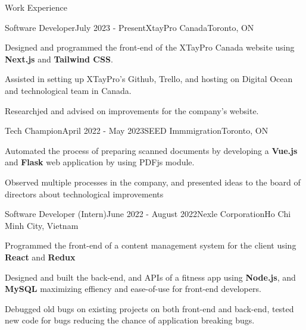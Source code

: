 \documentclass[
	11pt, %
]{resume} %
\begin{document}



\begin{rSection}{Work Experience}

	\begin{rSubsection}{Software Developer}{July 2023 - Present}{XtayPro Canada}{Toronto, ON}
		\item Designed and programmed the front-end of the XTayPro Canada website using \textbf{Next.js} and \textbf{Tailwind CSS}.
		\item Assisted in setting up XTayPro's Github, Trello, and hosting on Digital Ocean and technological team in Canada.
		\item Researchjed and advised on improvements for the company's website.
	\end{rSubsection}


	\begin{rSubsection}{Tech Champion}{April 2022 - May 2023}{SEED Immmigration}{Toronto, ON}
		\item Automated the process of preparing scanned documents by developing a \textbf{Vue.js} and \textbf{Flask} web application by using PDFjs module.
		\item Observed multiple processes in the company, and presented ideas to the board of directors about technological improvements
	\end{rSubsection}


	\begin{rSubsection}{Software Developer (Intern)}{June 2022 - August 2022}{Nexle Corporation}{Ho Chi Minh City, Vietnam}
		\item Programmed the front-end of a content management system for the client using \textbf{React} and \textbf{Redux}
		\item Designed and built the back-end, and APIs of a fitness app using \textbf{Node.js}, and \textbf{MySQL} maximizing effiency and ease-of-use for front-end developers.
		\item Debugged old bugs on existing projects on both front-end and back-end, tested new code for bugs reducing the chance of application breaking bugs.
	\end{rSubsection}

\end{rSection}
\end{document}
